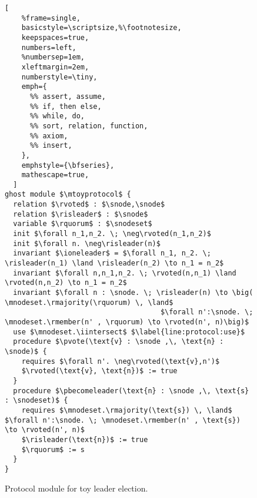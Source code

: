 \begin{figure}
\begin{lstlisting}[
    %frame=single,
    basicstyle=\scriptsize,%\footnotesize,
    keepspaces=true,
    numbers=left,
    %numbersep=1em,
    xleftmargin=2em,
    numberstyle=\tiny,
    emph={
      %% assert, assume,
      %% if, then else,
      %% while, do,
      %% sort, relation, function,
      %% axiom,
      %% insert,
    },
    emphstyle={\bfseries},
    mathescape=true,
  ]
ghost module $\mtoyprotocol$ {
  relation $\rvoted$ : $\snode,\snode$
  relation $\risleader$ : $\snode$
  variable $\rquorum$ : $\snodeset$
  init $\forall n_1,n_2. \; \neg\rvoted(n_1,n_2)$
  init $\forall n. \neg\risleader(n)$
  invariant $\ioneleader$ = $\forall n_1, n_2. \; \risleader(n_1) \land \risleader(n_2) \to n_1 = n_2$
  invariant $\forall n,n_1,n_2. \; \rvoted(n,n_1) \land \rvoted(n,n_2) \to n_1 = n_2$
  invariant $\forall n : \snode. \; \risleader(n) \to \big( \mnodeset.\rmajority(\rquorum) \, \land$
                                     $\forall n':\snode. \; \mnodeset.\rmember(n' , \rquorum) \to \rvoted(n', n)\big)$
  use $\mnodeset.\iintersect$ $\label{line:protocol:use}$
  procedure $\pvote(\text{v} : \snode ,\, \text{n} : \snode)$ {
    requires $\forall n'. \neg\rvoted(\text{v},n')$
    $\rvoted(\text{v}, \text{n})$ := true
  }
  procedure $\pbecomeleader(\text{n} : \snode ,\, \text{s} : \snodeset)$ {
    requires $\mnodeset.\rmajority(\text{s}) \, \land$ $\forall n':\snode. \; \mnodeset.\rmember(n' , \text{s}) \to \rvoted(n', n)$
    $\risleader(\text{n})$ := true
    $\rquorum$ := s
  }
}
\end{lstlisting}
\caption{\label{fig:toyprotocol}Protocol module for toy leader election.}
\end{figure}
